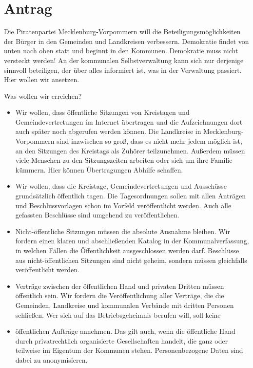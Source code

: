 \section{Antrag}

Die Piratenpartei Mecklenburg-Vorpommern will die Beteiligungsmöglichkeiten der Bürger in den Gemeinden und Landkreisen verbessern. Demokratie findet von unten nach oben statt und beginnt in den Kommunen. Demokratie muss nicht versteckt werden! An der kommunalen Selbstverwaltung kann sich nur derjenige sinnvoll beteiligen, der über alles informiert ist, was in der Verwaltung passiert. Hier wollen wir ansetzen.

Was wollen wir erreichen?

\begin{itemize}
\item
  Wir wollen, dass öffentliche Sitzungen von Kreistagen und Gemeindevertretungen im Internet übertragen und die Aufzeichnungen dort auch später noch abgerufen werden können. Die Landkreise in Mecklenburg-Vorpommern sind inzwischen so groß, dass es nicht mehr jedem möglich ist, an den Sitzungen des Kreistags als Zuhörer teilzunehmen. Außerdem müssen viele Menschen zu den Sitzungszeiten arbeiten oder sich um ihre Familie kümmern. Hier können Übertragungen Abhilfe schaffen.
\item
  Wir wollen, dass die Kreistage, Gemeindevertretungen und Ausschüsse grundsätzlich öffentlich tagen. Die Tagesordnungen sollen mit allen Anträgen und Beschlussvorlagen schon im Vorfeld veröffentlicht werden. Auch alle gefassten Beschlüsse sind umgehend zu veröffentlichen.
\item
  Nicht-öffentliche Sitzungen müssen die absolute Ausnahme bleiben. Wir fordern einen klaren und abschließenden Katalog in der Kommunalverfassung, in welchen Fällen die Öffentlichkeit ausgeschlossen werden darf. Beschlüsse aus nicht-öffentlichen Sitzungen sind nicht geheim, sondern müssen gleichfalls veröffentlicht werden.
\item
  Verträge zwischen der öffentlichen Hand und privaten Dritten müssen öffentlich sein. Wir fordern die Veröffentlichung aller Verträge, die die Gemeinden, Landkreise und kommunalen Verbände mit dritten Personen schließen. Wer sich auf das Betriebsgeheimnis berufen will, soll keine
\item
  öffentlichen Aufträge annehmen. Das gilt auch, wenn die öffentliche Hand durch privatrechtlich organisierte Gesellschaften handelt, die ganz oder teilweise im Eigentum der Kommunen stehen. Personenbezogene Daten sind dabei zu anonymisieren.
\end{itemize}

